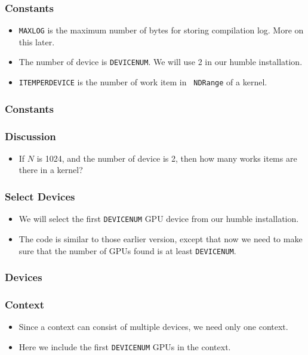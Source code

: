 \documentclass{beamer}
\begin{document}
\begin{frame}
  \frametitle{Constants}
  \begin{itemize}
    \item {\tt MAXLOG} is the maximum number of bytes for storing
      compilation log.  More on this later.
    \item The number of device is {\tt DEVICENUM}.  We will use 2 in
      our humble installation.
    \item {\tt ITEMPERDEVICE} is the number of work item in {\tt
      NDRange} of a kernel.
  \end{itemize}
\end{frame}

\begin{frame}
  \frametitle{Constants}
\end{frame}

\begin{frame}
  \frametitle{Discussion}
  \begin{itemize}
    \item If $N$ is 1024, and the number of device is 2, then how many
      works items are there in a kernel?
  \end{itemize}
\end{frame}

\begin{frame}
  \frametitle{Select Devices}
  \begin{itemize}
  \item We will select the first {\tt DEVICENUM} GPU device from our
    humble installation.
  \item The code is similar to those earlier version, except that
    now we need to make sure that the number of GPUs found is at
    least {\tt DEVICENUM}.
  \end{itemize}
\end{frame}

\begin{frame}
  \frametitle{Devices}
\end{frame}

\begin{frame}
  \frametitle{Context}
  \begin{itemize}
    \item Since a context can consist of multiple devices, we need
      only one context.
      \item Here we include the first {\tt DEVICENUM} GPUs in the
        context.
  \end{itemize}
\end{frame}
\end{document}
